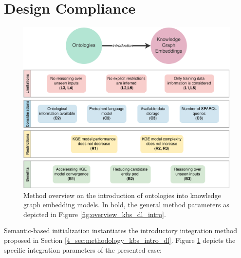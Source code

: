 \color{black}

\section{Design Compliance}\label{4_sec:method_assessment}
\begin{figure}[ht]
    \centering
    \includegraphics[width=\linewidth]{4_kbsintegrationdl/figures/Instance_KB_into_DL.eps}
    \caption{Method overview on the introduction of ontologies into knowledge graph embedding models. In bold, the general method parameters as depicted in Figure \ref{fig:overview_kbs_dl_intro}.}
    \label{fig:instance_method_kbs_into_dl}
\end{figure}

Semantic-based initialization instantiates the introductory integration method proposed in Section \ref{4_sec:methodology_kbs_intro_dl}. Figure \ref{fig:instance_method_kbs_into_dl} depicts the specific integration parameters of the presented case:

